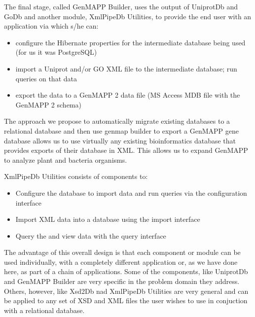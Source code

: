 The final stage, called GenMAPP Builder, uses the output of UniprotDb and GoDb and another module, XmlPipeDb Utilities, to provide the end user with an application via which s/he can: 
\begin{itemize}
	\item {configure the Hibernate properties for the intermediate database being used (for us it was PostgreSQL)}
	\item {import a Uniprot and/or GO XML file to the intermediate database; run queries on that data}
	\item {export the data to a GenMAPP 2 data file (MS Access MDB file with the GenMAPP 2 schema)}
\end{itemize}


The approach we propose to automatically migrate existing databases to a relational database and then use genmap builder to export a GenMAPP gene database allows us to use virtually any existing bioinformatics database that provides exports of their database in XML.  This allows us to expand GenMAPP to analyze plant and bacteria organisms.  

XmlPipeDb Utilities consists of components to:
 \begin{itemize}
	\item {Configure the database to import data and run queries via the configuration interface}
	\item {Import XML data into a database using the import interface}
	\item {Query the and view data with the query interface}
\end{itemize}

The advantage of this overall design is that each component or module can be used individually, with a completely different application or, as we have done here, as part of a chain of applications. Some of the components, like UniprotDb and GenMAPP Builder are very specific in the problem domain they address. Others, however, like Xsd2Db nad XmlPipeDb Utilities are very general and can be applied to any set of XSD and XML files the user wishes to use in conjuction with a relational database.
